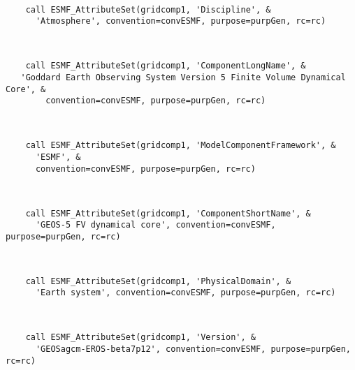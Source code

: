 
 \begin{verbatim}

    call ESMF_AttributeSet(gridcomp1, 'Discipline', &
      'Atmosphere', convention=convESMF, purpose=purpGen, rc=rc)
 
\end{verbatim}
 

 \begin{verbatim}

    call ESMF_AttributeSet(gridcomp1, 'ComponentLongName', &
   'Goddard Earth Observing System Version 5 Finite Volume Dynamical Core', &
        convention=convESMF, purpose=purpGen, rc=rc)
 
\end{verbatim}
 

 \begin{verbatim}

    call ESMF_AttributeSet(gridcomp1, 'ModelComponentFramework', &
      'ESMF', &
      convention=convESMF, purpose=purpGen, rc=rc)
 
\end{verbatim}
 

 \begin{verbatim}

    call ESMF_AttributeSet(gridcomp1, 'ComponentShortName', &
      'GEOS-5 FV dynamical core', convention=convESMF, purpose=purpGen, rc=rc)
 
\end{verbatim}
 

 \begin{verbatim}

    call ESMF_AttributeSet(gridcomp1, 'PhysicalDomain', &
      'Earth system', convention=convESMF, purpose=purpGen, rc=rc)
 
\end{verbatim}
 

 \begin{verbatim}

    call ESMF_AttributeSet(gridcomp1, 'Version', &
      'GEOSagcm-EROS-beta7p12', convention=convESMF, purpose=purpGen, rc=rc)
 
\end{verbatim}
 
